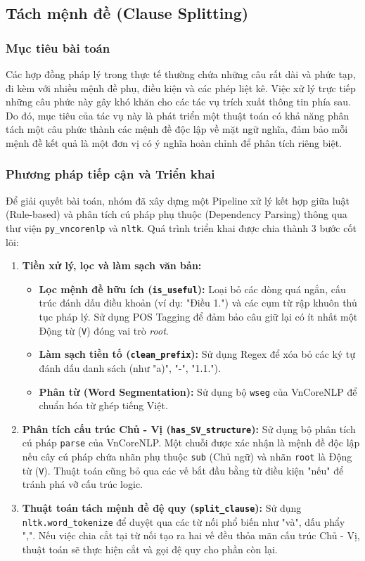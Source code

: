 \subsection{Tách mệnh đề (Clause Splitting)}

\subsubsection{Mục tiêu bài toán}
Các hợp đồng pháp lý trong thực tế thường chứa những câu rất dài và phức tạp, đi kèm với nhiều mệnh đề phụ, điều kiện và các phép liệt kê. Việc xử lý trực tiếp những câu phức này gây khó khăn cho các tác vụ trích xuất thông tin phía sau. Do đó, mục tiêu của tác vụ này là phát triển một thuật toán có khả năng phân tách một câu phức thành các mệnh đề độc lập về mặt ngữ nghĩa, đảm bảo mỗi mệnh đề kết quả là một đơn vị có ý nghĩa hoàn chỉnh để phân tích riêng biệt.

\subsubsection{Phương pháp tiếp cận và Triển khai}
Để giải quyết bài toán, nhóm đã xây dựng một Pipeline xử lý kết hợp giữa luật (Rule-based) và phân tích cú pháp phụ thuộc (Dependency Parsing) thông qua thư viện \texttt{py\_vncorenlp} và \texttt{nltk}. Quá trình triển khai được chia thành 3 bước cốt lõi:

\begin{enumerate}
    \item \textbf{Tiền xử lý, lọc và làm sạch văn bản:} 
    \begin{itemize}
        \item \textbf{Lọc mệnh đề hữu ích (\texttt{is\_useful}):} Loại bỏ các dòng quá ngắn, cấu trúc đánh dấu điều khoản (ví dụ: "Điều 1.") và các cụm từ rập khuôn thủ tục pháp lý. Sử dụng POS Tagging để đảm bảo câu giữ lại có ít nhất một Động từ (\texttt{V}) đóng vai trò \textit{root}.
        \item \textbf{Làm sạch tiền tố (\texttt{clean\_prefix}):} Sử dụng Regex để xóa bỏ các ký tự đánh dấu danh sách (như "a)", "-", "1.1.").
        \item \textbf{Phân từ (Word Segmentation):} Sử dụng bộ \texttt{wseg} của VnCoreNLP để chuẩn hóa từ ghép tiếng Việt.
    \end{itemize}

    \item \textbf{Phân tích cấu trúc Chủ - Vị (\texttt{has\_SV\_structure}):} 
    Sử dụng bộ phân tích cú pháp \texttt{parse} của VnCoreNLP. Một chuỗi được xác nhận là mệnh đề độc lập nếu cây cú pháp chứa nhãn phụ thuộc \texttt{sub} (Chủ ngữ) và nhãn \texttt{root} là Động từ (\texttt{V}). Thuật toán cũng bỏ qua các vế bắt đầu bằng từ điều kiện "nếu" để tránh phá vỡ cấu trúc logic.

    \item \textbf{Thuật toán tách mệnh đề đệ quy (\texttt{split\_clause}):} 
    Sử dụng \texttt{nltk.word\_tokenize} để duyệt qua các từ nối phổ biến như "và", dấu phẩy ",". Nếu việc chia cắt tại từ nối tạo ra hai vế đều thỏa mãn cấu trúc Chủ - Vị, thuật toán sẽ thực hiện cắt và gọi đệ quy cho phần còn lại.
\end{enumerate}

